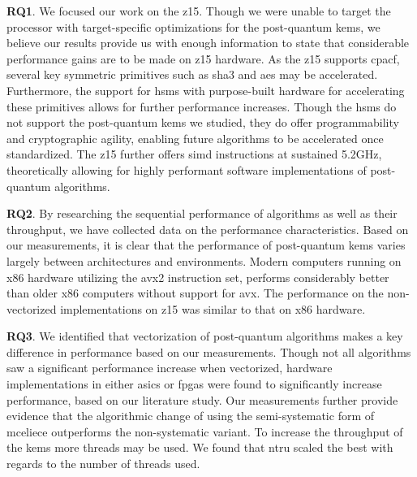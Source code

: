 \noindent\textbf{RQ1}. We focused our work on the \gls{z15}. Though we were unable to target the processor with target-specific optimizations for the \gls{post-quantum} \glspl{kem}, we believe our results provide us with enough information to state that considerable performance gains are to be made on \gls{z15} hardware. As the \gls{z15} supports \gls{cpacf}, several key symmetric primitives such as \gls{sha3} and \gls{aes} may be accelerated. Furthermore, the support for \glspl{hsm} with purpose-built hardware for accelerating these primitives allows for further performance increases. Though the \glspl{hsm} do not support the \gls{post-quantum} \glspl{kem} we studied, they do offer programmability and cryptographic agility, enabling future algorithms to be accelerated once standardized. The \gls{z15} further offers \gls{simd} instructions at sustained 5.2GHz, theoretically allowing for highly performant software implementations of \gls{post-quantum} algorithms. 

\noindent\textbf{RQ2}. By researching the sequential performance of algorithms as well as their throughput, we have collected data on the performance characteristics. Based on our measurements, it is clear that the performance of \gls{post-quantum} \glspl{kem} varies largely between architectures and environments. Modern computers running on \gls{x86} hardware utilizing the \gls{avx2} instruction set, performs considerably better than older \gls{x86} computers without support for \gls{avx}. The performance on the non-vectorized implementations on \gls{z15} was similar to that on \gls{x86} hardware.

\noindent\textbf{RQ3}. We identified that vectorization of \gls{post-quantum} algorithms makes a key difference in performance based on our measurements. Though not all algorithms saw a significant performance increase when vectorized, hardware implementations in either \glspl{asic} or \glspl{fpga} were found to significantly increase performance, based on our literature study. Our measurements further provide evidence that the algorithmic change of using the semi-systematic form of \gls{mceliece} outperforms the non-systematic variant. To increase the throughput of the \glspl{kem} more threads may be used. We found that \gls{ntru} scaled the best with regards to the number of threads used.


